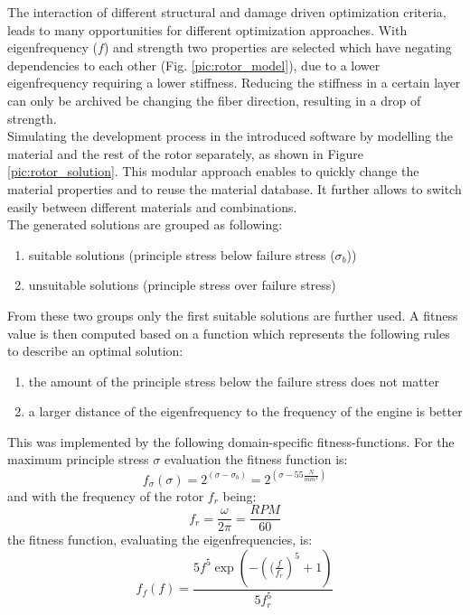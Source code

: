 The interaction of different structural and damage driven optimization criteria, leads to many opportunities for different optimization approaches. 
With eigenfrequency ($f$) and strength  two properties are selected which have negating dependencies to each other (Fig. \ref{pic:rotor_model}),
due to a lower eigenfrequency requiring a lower stiffness.
Reducing the stiffness in a certain layer can only be archived be changing the fiber direction, resulting in a drop of strength.\\
Simulating the development process in the introduced software by 
modelling the material and the rest of the rotor separately, as shown in Figure \ref{pic:rotor_solution}.
This modular approach enables to quickly change the material properties and to reuse the material database.
It further allows to switch easily between different materials and combinations.\\
The generated solutions are grouped as following:
\begin{enumerate}
    \item suitable solutions (principle stress below failure stress ($\sigma_b$))
    \item unsuitable solutions (principle stress over failure stress)
\end{enumerate}
From these two groups only the first suitable solutions are further used.
A fitness value is then computed based on a function which represents the following rules to describe an optimal solution:
\begin{enumerate}
    \item the amount of the principle stress below the failure stress does not matter
    \item a larger distance of the eigenfrequency to the frequency of the engine is better
\end{enumerate}
This was implemented by the following domain-specific fitness-functions.
For the maximum principle stress $\sigma$ evaluation the fitness function is:
\begin{equation}
    \label{eq:fitness_stress}
    f_{\sigma}(\sigma)=2^{(\sigma-\sigma_{b})}=2^{(\sigma-55\frac{N}{mm^2})}
\end{equation}
and with the frequency of the rotor $f_{r}$ being:
\begin{equation}
    \label{eq:rotation_frequency}
    f_{r}=\frac{\omega}{2\pi}=\frac{RPM}{60}
\end{equation}
the fitness function, evaluating the eigenfrequencies, is:
\begin{equation}
    \label{eq:fitness_freq}
    f_{f}(f)=\frac{5 f^5 \exp{\left(-\left((\frac{f}{f_r}\right)^5 + 1\right)}}{5 f_r^5}
\end{equation}
